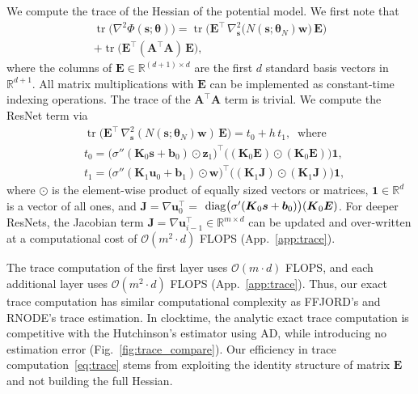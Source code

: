\documentclass[letterpaper]{article}
\newcommand{\bfth}{\boldsymbol{\theta}}
\newcommand{\bfb}{\boldsymbol{b}}
\newcommand{\bfs}{\boldsymbol{s}}
\newcommand{\bfu}{\boldsymbol{u}}
\newcommand{\bfw}{\boldsymbol{w}}
\newcommand{\bfz}{\boldsymbol{z}}
\newcommand{\bfA}{\boldsymbol{A}}
\newcommand{\bfE}{\boldsymbol{E}}
\newcommand{\bfJ}{\boldsymbol{J}}
\newcommand{\bfK}{\boldsymbol{K}}
\def\tr{\operatorname{tr}}
\newcommand{\R}{\ensuremath{\mathds{R}}}
\newcommand{\bigO}{\ensuremath{\mathcal{O}}}
\begin{document}
	We compute the trace of the Hessian of the potential model.
	We first note that%
	\begin{equation} 
	    \label{eq:laplace}
	    \begin{split}
	     \tr \big(\nabla^2 \Phi(\bfs;\bfth)\big) =  \tr \Big(\bfE^\top \, \nabla_{\bfs}^2 \big( N(\bfs;\bfth_N ) \bfw \big) \, \bfE \Big)\\
	      + \tr \Big(\bfE^\top (\bfA^\top \bfA) \, \bfE \Big),
		\end{split}
	\end{equation}
	where the columns of $\bfE \in \R^{(d+1)\times d}$ are the first $d$ standard basis vectors in $\R^{d+1}$. All matrix multiplications with $\bfE$ can be implemented as constant-time indexing operations. 
	The trace of the $\bfA^\top \bfA$ term is trivial. We compute the ResNet term via
	\begin{equation} \label{eq:trace}
	\begin{split}
	     &\tr \big(\bfE^\top \, \nabla_{\bfs}^2 ( N(\bfs;\bfth_N) \bfw) \,\bfE \big)  = t_0 + h \, t_1,
	     \;\; \text{where}\\ 
	     &t_0 = \big(\sigma''(\bfK_0 \bfs + \bfb_0) \odot \bfz_1 \big)^\top \big((\bfK_0 \bfE)\odot(\bfK_0 \bfE)\big) \mathbf{1}, \\
	     &t_1 = \big(\sigma''(\bfK_1 \bfu_{0} + \bfb_1) \odot \bfw\big)^\top \big((\bfK_1 \bfJ)\odot(\bfK_1 \bfJ)\big) \mathbf{1},
	\end{split}
	\end{equation}
	where $\odot$ is the element-wise product of equally sized vectors or matrices, $\mathbf{1} \in \R^{d}$ is a vector of all ones, and $\bfJ = \nabla \bfu_{0}^\top=$ $ {\rm diag} \big( \sigma'(\bfK_0 \bfs + \bfb_0) \big) ( \bfK_0 \bfE)$. For deeper ResNets, the Jacobian term $\bfJ = \nabla \bfu_{i-1}^\top \in \R^{m\times d}$ can be updated and over-written at a computational cost of $\bigO(m^2 \cdot d)$ FLOPS (App.~\ref{app:trace}).
	
	The trace computation of the first layer uses $\bigO(m\cdot d)$ FLOPS, and each additional layer uses $\bigO(m^2 \cdot d)$ FLOPS (App.~\ref{app:trace}).
	Thus, our exact trace computation has similar computational complexity as FFJORD's and RNODE's trace estimation.
	In clocktime, the analytic exact trace computation is competitive with the Hutchinson's estimator using AD, while introducing no estimation error (Fig.~\ref{fig:trace_compare}).
	Our efficiency in trace computation~\eqref{eq:trace} stems from exploiting the identity structure of matrix $\bfE$ and not building the full Hessian.
	
\end{document}
